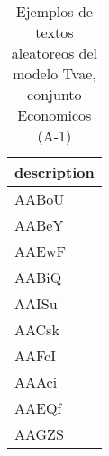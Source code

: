 \begin{table}[H]
\centering
\fontsize{8}{14}\selectfont
\caption{Ejemplos de textos aleatoreos del modelo Tvae, conjunto Economicos (A-1)}
\label{table-sample10-economicos-a-1-tvae-text}
\begin{tabular}{|m{50em}|}
\hline
\rowcolor[gray]{0.8}
description \\
\hline AABoU \\
\hline AABeY \\
\hline AAEwF \\
\hline AABiQ \\
\hline AAISu \\
\hline AACsk \\
\hline AAFcI \\
\hline AAAci \\
\hline AAEQf \\
\hline AAGZS \\
\hline
\end{tabular}
\end{table}
